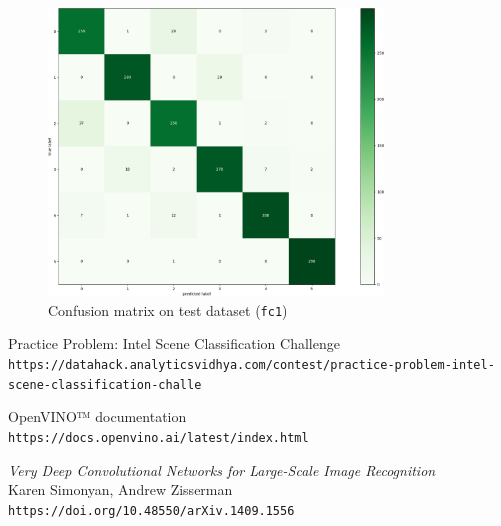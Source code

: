 \documentclass[compsoc]{IEEEtran}
\begin{document}
\begin{figure}[ht!]
\centering                                                                        
\includegraphics[width=3.5in]{../images/cm1-test.png}
\captionsetup{justification=centering}                                                                                         
\caption{Confusion matrix on test dataset (\texttt{fc1})}
\label{fig:cm1-test}                                                                                                                               
\end{figure}






\begin{thebibliography}{9}

Practice Problem: Intel Scene Classification Challenge \\
\texttt{https://datahack.analyticsvidhya.com/contest/practice-problem-intel-scene-classification-challe}

OpenVINO™ documentation \\
\texttt{https://docs.openvino.ai/latest/index.html}

\emph{Very Deep Convolutional Networks for Large-Scale Image Recognition} \\
Karen Simonyan, Andrew Zisserman \\
\texttt{https://doi.org/10.48550/arXiv.1409.1556}

\end{thebibliography}
\end{document}
